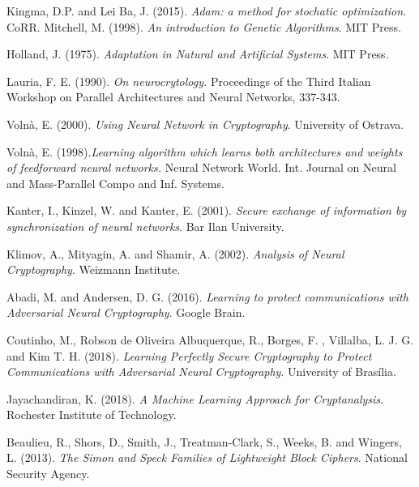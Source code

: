 \documentclass[%
    corpo=11pt,
    twoside,
    stile=classica,
    oldstyle,
    autoretitolo,
    tipotesi=magistrale,
    greek,
    evenboxes,
    english
]{toptesi}
\begin{document}
\begin{thebibliography}{99}
 {\sc Kingma, D.P.} and {\sc Lei Ba, J.} (2015). \textit{Adam: a method for stochatic optimization}. CoRR.
 {\sc Mitchell, M.} (1998). \textit{An introduction to Genetic Algorithms}. MIT Press.

 {\sc Holland, J.} (1975). \textit{Adaptation in Natural and Artificial Systems}. MIT Press. 

 {\sc Lauria, F. E.} (1990). \textit{On neurocrytology.} Proceedings of the Third Italian Workshop on Parallel Architectures and Neural Networks, 337-343.

 {\sc Volnà, E.} (2000). \textit{Using Neural Network in Cryptography}. University of Ostrava.

 {\sc Volnà, E.} (1998).\textit{Learning algorithm which learns both architectures and weights of feedforward neural networks.} Neural Network World. Int. Journal on Neural and Mass-Parallel Compo and Inf. Systems.

 {\sc Kanter, I.}, {\sc Kinzel, W.} and {\sc Kanter, E.} (2001). \textit{Secure exchange of information by synchronization of neural networks}. Bar Ilan University.

 {\sc Klimov, A.}, {\sc Mityagin, A.} and {\sc Shamir, A.} (2002). \textit{Analysis of Neural Cryptography}. Weizmann Institute.


 {\sc Abadi, M.} and {\sc Andersen, D. G.} (2016). \textit{Learning to protect communications with Adversarial Neural Cryptography}. Google Brain.

 {\sc Coutinho, M.}, {\sc Robson de Oliveira Albuquerque, R.}, {\sc Borges, F. }, {\sc Villalba, L. J. G.} and  {\sc Kim T. H.} (2018). \textit{Learning Perfectly Secure Cryptography to Protect Communications with Adversarial Neural Cryptography}. University of Brasília.

 {\sc Jayachandiran, K.} (2018). \textit{A Machine Learning Approach for Cryptanalysis}. Rochester Institute of Technology.

 {\sc Beaulieu, R.}, {\sc Shors, D.}, {\sc Smith, J.}, {\sc Treatman-Clark, S.}, {\sc Weeks, B.} and {\sc Wingers, L.} (2013). \textit{The Simon and Speck Families of Lightweight Block Ciphers}. National Security Agency.


\end{thebibliography}
\end{document}

